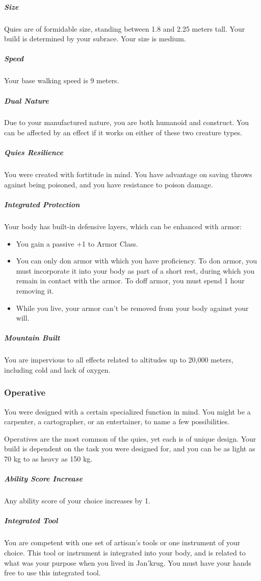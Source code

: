     \subparagraph{Size} Quies are of formidable size, standing between 1.8 and 2.25 meters tall.
    Your build is determined by your subrace.
    Your size is medium.

    \subparagraph{Speed} Your base walking speed is 9 meters.

    \subparagraph{Dual Nature} Due to your manufactured nature, you are both humanoid and construct.
    You can be affected by an effect if it works on either of these two creature types.

    \subparagraph{Quies Resilience} You were created with fortitude in mind.
    You have advantage on saving throws against being poisoned, and you have resistance to poison damage.

    \subparagraph{Integrated Protection} Your body has built-in defensive layers, which can be enhanced with armor:

    \begin{itemize}
        \item You gain a passive +1 to Armor Class.
        \item You can only don armor with which you have proficiency.
        To don armor, you must incorporate it into your body as part of a short rest, during which you remain in contact with the armor.
        To doff armor, you must spend 1 hour removing it.
        \item While you live, your armor can't be removed from your body against your will.
    \end{itemize}

    \subparagraph{Mountain Built} You are impervious to all effects related to altitudes up to 20,000 meters, including cold and lack of oxygen.

\subsubsection{Operative}
    You were designed with a certain specialized function in mind.
    You might be a carpenter, a cartographer, or an entertainer, to name a few possibilities.

    Operatives are the most common of the quies, yet each is of unique design.
    Your build is dependent on the task you were designed for, and you can be as light as 70 kg to as heavy as 150 kg.

    \subparagraph{Ability Score Increase} Any ability score of your choice increases by 1.

    \subparagraph{Integrated Tool} You are competent with one set of artisan's tools or one instrument of your choice.
    This tool or instrument is integrated into your body, and is related to what was your purpose when you lived in Jan'krug.
    You must have your hands free to use this integrated tool.

